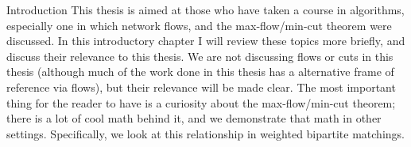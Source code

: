 \begin{section}{Introduction}
	This thesis is aimed at those who have taken a course in algorithms, especially one in which 
	network flows, and the max-flow/min-cut theorem were discussed. In this introductory chapter 
	I will review these topics more briefly, and discuss their relevance to this thesis. 
	We are not discussing flows or cuts in this thesis (although much of the work done in this 
	thesis has a alternative frame of reference via flows), but their relevance will be made clear. 
	The most important thing for the reader to have is a curiosity about the max-flow/min-cut 
	theorem; there is a lot of cool math behind it, and we demonstrate that math in other settings. 
	Specifically, we look at this relationship in weighted bipartite matchings.
\end{section}

